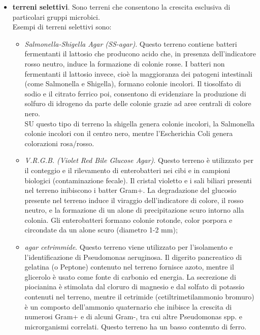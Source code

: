 \documentclass[11pt]{book}
\begin{document}
\begin{itemize}
\item \textbf{terreni selettivi}. Sono terreni che consentono la crescita esclusiva di particolari gruppi microbici.\\
Esempi di terreni selettivi sono:
\begin{itemize}
\item \emph{Salmonella-Shigella Agar (SS-agar)}. Questo terreno contiene batteri fermentanti il lattosio che producono acido che, in presenza dell'indicatore rosso neutro, induce la formazione di colonie rosse. I batteri non fermentanti il lattosio invece, cioè la maggioranza dei patogeni intestinali (come Salmonella e Shigella), formano colonie incolori. Il tiosolfato di sodio e il citrato ferrico poi, consentono di evidenziare la produzione di solfuro di idrogeno da parte delle colonie grazie ad aree centrali di colore nero.\\
SU questo tipo di terreno la shigella genera colonie incolori, la Salmonella colonie incolori con il centro nero, mentre l'Escherichia Coli genera colorazioni rosa/rosso.
\item \emph{V.R.G.B. (Violet Red Bile Glucose Agar)}. Questo terreno è utilizzato per il conteggio e il rilevamento di enterobatteri nei cibi e in campioni biologici (contaminazione fecale). Il cristal violetto e i sali biliari presenti nel terreno inibiscono i batter Gram+. La degradazione del glucosio presente nel terreno induce il viraggio dell’indicatore di colore, il rosso neutro, e la formazione di un alone di precipitazione scuro intorno alla colonia. Gli enterobatteri formano colonie rotonde, color porpora e circondate da un alone scuro (diametro 1-2 mm);
\item \emph{agar cetrimmide}. Questo terreno viene utilizzato per l’isolamento e l’identificazione di Pseudomonas aeruginosa. Il digerito pancreatico di gelatina (o Peptone) contenuto nel terreno fornisce azoto, mentre il glicerolo è usato come fonte di carbonio ed energia.
La secrezione di piocianina è stimolata dal cloruro di magnesio e dal solfato di potassio contenuti nel terreno, mentre il cetrimide (cetiltrimetilammonio bromuro) è un composto dell'ammonio quaternario che inibisce la crescita di numerosi Gram+ e di alcuni Gram-, tra cui altre Pseudomonas spp. e microrganismi correlati. Questo terreno ha un basso contenuto di ferro.
\end{itemize} 



\end{itemize}
\end{document}
